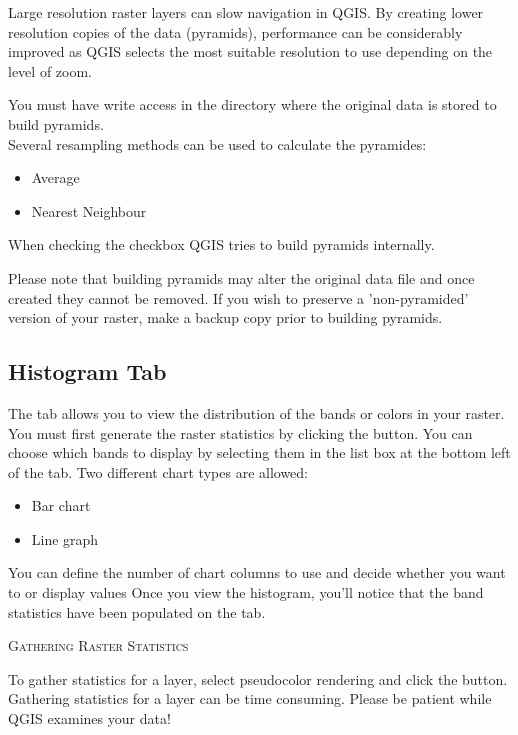 Large resolution raster layers can slow navigation in QGIS. By creating lower
resolution copies of the data (pyramids), performance can be considerably
improved as QGIS selects the most suitable resolution to use depending on the
level of zoom.

You must have write access in the directory where the original data is stored
to build pyramids. \\
Several resampling methods can be used to calculate the pyramides:
\begin{itemize}[label=--]
\item Average
\item Nearest Neighbour
\end{itemize}

When checking the checkbox  QGIS tries to build pyramids internally.

Please note that building pyramids may alter the original data file and once
created they cannot be removed. If you wish to preserve a 'non-pyramided'
version of your raster, make a backup copy prior to building pyramids.

\subsection{Histogram Tab}\label{label_histogram}

The  tab allows you to view the distribution
of the bands or colors in your raster. You must first generate the raster statistics
by clicking the  button. You can choose which bands to display by
selecting them in the list box at the bottom left of the tab. Two different
chart types are allowed:

\begin{itemize}[label=--]
\item Bar chart
\item Line graph
\end{itemize}

You can define the number of chart columns to use and decide whether you want
to  or display  values
Once you view the histogram, you'll notice that the band statistics have been
populated on the  tab.

\begin{Tip}\caption{\textsc{Gathering Raster Statistics}}
To gather statistics for a layer, select pseudocolor rendering and
click the  button. Gathering statistics for a layer can be time
consuming. Please be patient while QGIS examines your
data!
\end{Tip}

